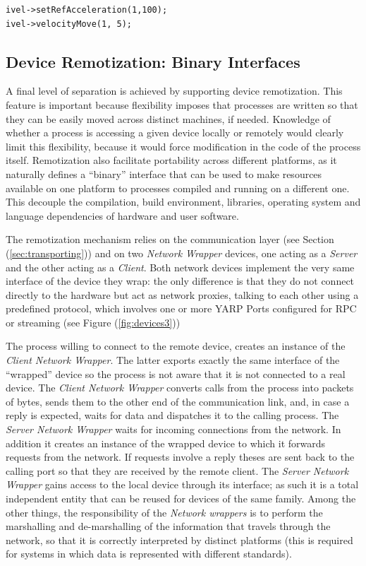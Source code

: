 \begin{verbatim}
ivel->setRefAcceleration(1,100);
ivel->velocityMove(1, 5);
\end{verbatim}


\subsection{Device Remotization: Binary Interfaces}
A final level of separation is achieved by supporting device remotization. 
This feature is important because flexibility imposes 
that processes are written so that they can be easily moved across 
distinct machines, if needed. Knowledge of whether a process is accessing 
a given device locally or remotely would clearly limit this flexibility, 
because it would force modification in the code of the process itself. 
Remotization also facilitate portability across different platforms, as 
it naturally defines a ``binary'' interface that can 
be used to make resources available on one platform to processes compiled 
and running on a different one. This decouple the compilation, build 
environment, libraries, operating system and language dependencies of 
hardware and user software.

The remotization mechanism relies on the communication layer 
(see Section (\ref{sec:transporting})) and on two 
\emph{Network Wrapper} devices, 
one acting as a \emph{Server} and the other acting as a \emph{Client}. 
Both network devices implement the very same interface of the device 
they wrap: the only difference is that they 
do not connect directly to the hardware but act as network proxies, 
talking to each other using a predefined protocol, which involves one or more 
YARP Ports configured for RPC or streaming (see Figure (\ref{fig:devices3}))

The process willing to connect to the remote device, 
creates an instance of the \emph{Client Network Wrapper}. The latter exports 
exactly the same interface of the 
``wrapped'' device so the process is not aware that it is not connected to 
a real device. The \emph{Client Network Wrapper} converts calls from 
the process into packets of bytes, sends them to the other end of the 
communication link, and, in case a reply is expected, waits for data and 
dispatches it to the calling process. 
%
The \emph{Server Network Wrapper} waits for incoming connections from 
the network. 
In addition it creates an instance of the wrapped 
device to which it forwards requests from the network. If requests
involve a reply theses are sent back to the 
calling port so that they are received by the remote client. The 
\emph{Server Network Wrapper} gains access to the local device through its 
interface; as such it is a total independent 
entity that can be reused for devices of the same family.
%
Among the other things, the responsibility of the \emph{Network wrappers} 
is to perform the marshalling and de-marshalling of the 
information that travels through the network, so that it is correctly 
interpreted by distinct platforms (this is required for systems in which 
data is represented with different standards).


